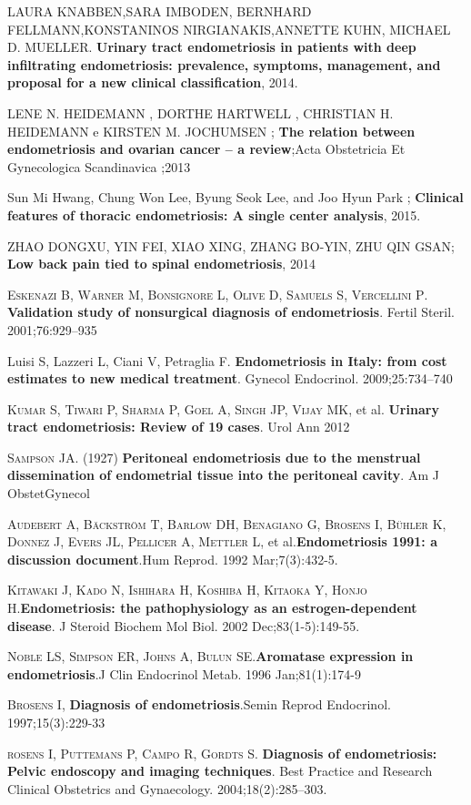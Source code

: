 \documentclass[12pt]{article} %
\begin{document}
LAURA KNABBEN,SARA IMBODEN, BERNHARD FELLMANN,KONSTANINOS NIRGIANAKIS,ANNETTE KUHN, MICHAEL D. MUELLER. \textbf{Urinary tract endometriosis in patients with deep infiltrating endometriosis: prevalence, symptoms, management, and proposal for a new clinical classification}, 2014.

LENE N. HEIDEMANN , DORTHE HARTWELL , CHRISTIAN H. HEIDEMANN e KIRSTEN M.
JOCHUMSEN ; \textbf{The relation between endometriosis and ovarian cancer – a
review};Acta Obstetricia Et Gynecologica Scandinavica ;2013

Sun Mi Hwang, Chung Won Lee, Byung Seok Lee, and Joo Hyun Park ;\textbf{ Clinical features of thoracic endometriosis: A single center analysis}, 2015.

ZHAO DONGXU, YIN FEI, XIAO XING, ZHANG BO-YIN, ZHU QIN GSAN;\textbf{ Low back pain tied to spinal endometriosis}, 2014

\textsc{Eskenazi B, Warner M, Bonsignore L, Olive D, Samuels S, Vercellini P}. \textbf{Validation study of nonsurgical diagnosis of endometriosis}. Fertil Steril. 2001;76:929–935

Luisi S, Lazzeri L, Ciani V, Petraglia F.\textbf{ Endometriosis in Italy: from cost estimates to new medical treatment}. Gynecol Endocrinol. 2009;25:734–740

\textsc{Kumar S, Tiwari P, Sharma P, Goel A, Singh JP, Vijay MK}, et al.\textbf{ Urinary tract endometriosis: Review of 19 cases}. Urol Ann 2012

\textsc{Sampson JA}. (1927) \textbf{Peritoneal endometriosis due to the
menstrual dissemination of endometrial tissue into the
peritoneal cavity}. Am J ObstetGynecol


\textsc{Audebert A, Bäckström T, Barlow DH, Benagiano G, Brosens I, Bühler K, Donnez J, Evers JL, Pellicer A, Mettler L}, et al.\textbf{Endometriosis 1991: a discussion document}.Hum Reprod. 1992 Mar;7(3):432-5.

\textsc{Kitawaki J, Kado N, Ishihara H, Koshiba H, Kitaoka Y, Honjo H}.\textbf{Endometriosis: the pathophysiology as an estrogen-dependent disease}. J Steroid Biochem Mol Biol. 2002 Dec;83(1-5):149-55.

\textsc{Noble LS, Simpson ER, Johns A, Bulun SE}.\textbf{Aromatase expression in endometriosis}.J Clin Endocrinol Metab. 1996 Jan;81(1):174-9

\textsc{Brosens I}, \textbf{Diagnosis of endometriosis}.Semin Reprod Endocrinol. 1997;15(3):229-33

\textsc{rosens I, Puttemans P, Campo R, Gordts S}. \textbf{Diagnosis of endometriosis: Pelvic endoscopy and imaging techniques}. Best Practice and Research Clinical Obstetrics and Gynaecology. 2004;18(2):285–303.
\end{document}
